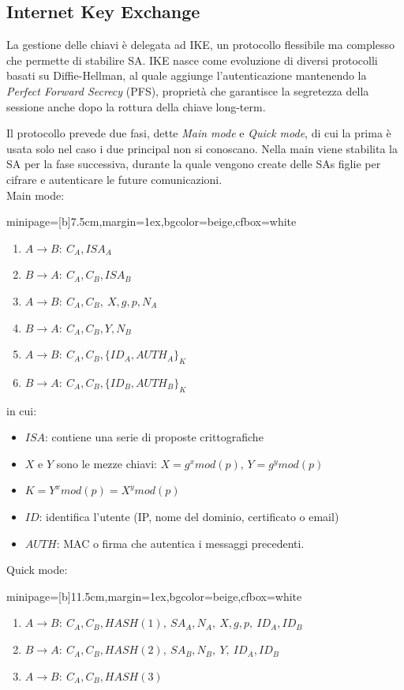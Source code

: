 \documentclass[a4paper, 11pt, twoside, openright, fleqn]{report}
\newcommand{\fromto}[2]{#1\rightarrow #2\!:\ }
\newenvironment{colbox}[2]%
{%
	\par\noindent\hspace{10pt}
	\begin{adjustbox}{minipage=[b]{#2},margin=1ex,bgcolor=#1,cfbox=white}
}{%
	\end{adjustbox}\newline%
}
\begin{document}
\subsection{Internet Key Exchange}
La gestione delle chiavi è delegata ad IKE, un protocollo flessibile ma complesso che permette di stabilire SA. IKE nasce come evoluzione di diversi protocolli basati su Diffie-Hellman, al quale aggiunge l'autenticazione mantenendo la \emph{Perfect Forward Secrecy} (PFS), proprietà che garantisce la segretezza della sessione anche dopo la rottura della chiave long-term.

Il protocollo prevede due fasi, dette \emph{Main mode} e \emph{Quick mode}, di cui la prima è usata solo nel caso i due principal non si conoscano. Nella main viene stabilita la SA per la fase successiva, durante la quale vengono create delle SAs figlie per cifrare e autenticare le future comunicazioni.\\
Main mode:
\begin{colbox}{beige}{7.5cm}
	\begin{enumerate}
		\item $\fromto{A}{B}C_A,ISA_A$
		\item $\fromto{B}{A}C_A,C_B,ISA_B$
		\item $\fromto{A}{B}C_A,C_B,\ X,g,p,N_A$
		\item $\fromto{B}{A}C_A,C_B,Y,N_B$
		\item $\fromto{A}{B}C_A,C_B,\{ID_A,AUTH_A\}_K$
		\item $\fromto{B}{A}C_A,C_B,\{ID_B,AUTH_B\}_K$
	\end{enumerate}
\end{colbox}
in cui:
\begin{itemize}
	\item $ISA$: contiene una serie di proposte crittografiche
	\item $X$ e $Y$ sono le mezze chiavi: $X = g^xmod(p)$, $Y = g^ymod(p)$
	\item $K = Y^xmod(p) = X^ymod(p)$
	\item $ID$: identifica l'utente (IP, nome del dominio, certificato o email)
	\item $AUTH$: MAC o firma che autentica i messaggi precedenti.
\end{itemize}
Quick mode:
\begin{colbox}{beige}{11.5cm}
	\begin{enumerate}
		\item $\fromto{A}{B}C_A,C_B,HASH(1),\ SA_A,N_A,\ X,g,p,\ ID_A,ID_B$
		\item $\fromto{B}{A}C_A,C_B,HASH(2),\ SA_B,N_B,\ Y,\ ID_A,ID_B$
		\item $\fromto{A}{B}C_A,C_B,HASH(3)$
	\end{enumerate}
\end{colbox}
\end{document}
